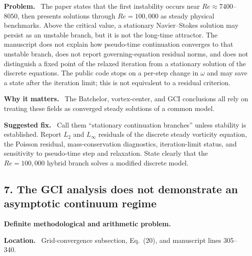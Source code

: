 \documentclass[11pt,a4paper]{article}
\newcommand{\classify}[1]{\textcolor{blue!65!black}{\textbf{#1}}}
\newcommand{\field}[1]{\par\noindent\textbf{#1}\ }
\begin{document}
\field{Problem.} The paper states that the first instability occurs near $Re\approx 7400$--$8050$, then presents solutions through $Re=100{,}000$ as steady physical benchmarks. Above the critical value, a stationary Navier--Stokes solution may persist as an unstable branch, but it is not the long-time attractor. The manuscript does not explain how pseudo-time continuation converges to that unstable branch, does not report governing-equation residual norms, and does not distinguish a fixed point of the relaxed iteration from a stationary solution of the discrete equations. The public code stops on a per-step change in $\omega$ and may save a state after the iteration limit; this is not equivalent to a residual criterion.

\field{Why it matters.} The Batchelor, vortex-center, and GCI conclusions all rely on treating these fields as converged steady solutions of a common model.

\field{Suggested fix.} Call them ``stationary continuation branches'' unless stability is established. Report $L_2$ and $L_\infty$ residuals of the discrete steady vorticity equation, the Poisson residual, mass-conservation diagnostics, iteration-limit status, and sensitivity to pseudo-time step and relaxation. State clearly that the $Re=100{,}000$ hybrid branch solves a modified discrete model.

\subsection*{7. The GCI analysis does not demonstrate an asymptotic continuum regime}

\classify{Definite methodological and arithmetic problem.}

\field{Location.} Grid-convergence subsection, Eq.~(20), and manuscript lines 305--340.
\end{document}
